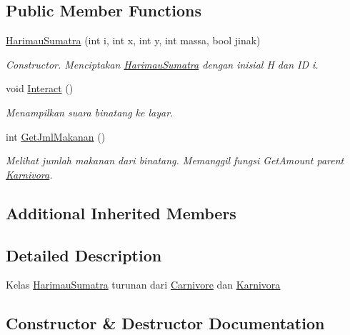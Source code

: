 \subsection*{Public Member Functions}
\begin{DoxyCompactItemize}
\item 
\hyperlink{classHarimauSumatra_ad2cf7f52161d04f3b8b8d7b78135dba1}{Harimau\+Sumatra} (int i, int x, int y, int massa, bool jinak)
\begin{DoxyCompactList}\small\item\em Constructor. Menciptakan \hyperlink{classHarimauSumatra}{Harimau\+Sumatra} dengan inisial \textquotesingle{}H\textquotesingle{} dan ID i. \end{DoxyCompactList}\item 
void \hyperlink{classHarimauSumatra_a3fdf99e5b76a900085c6cb04a179c90a}{Interact} ()\hypertarget{classHarimauSumatra_a3fdf99e5b76a900085c6cb04a179c90a}{}\label{classHarimauSumatra_a3fdf99e5b76a900085c6cb04a179c90a}

\begin{DoxyCompactList}\small\item\em Menampilkan suara binatang ke layar. \end{DoxyCompactList}\item 
int \hyperlink{classHarimauSumatra_a26c0ee52d2f214027e9998aeef3646e5}{Get\+Jml\+Makanan} ()
\begin{DoxyCompactList}\small\item\em Melihat jumlah makanan dari binatang. Memanggil fungsi Get\+Amount parent \hyperlink{classKarnivora}{Karnivora}. \end{DoxyCompactList}\end{DoxyCompactItemize}
\subsection*{Additional Inherited Members}


\subsection{Detailed Description}
Kelas \hyperlink{classHarimauSumatra}{Harimau\+Sumatra} turunan dari \hyperlink{classCarnivore}{Carnivore} dan \hyperlink{classKarnivora}{Karnivora} 

\subsection{Constructor \& Destructor Documentation}
